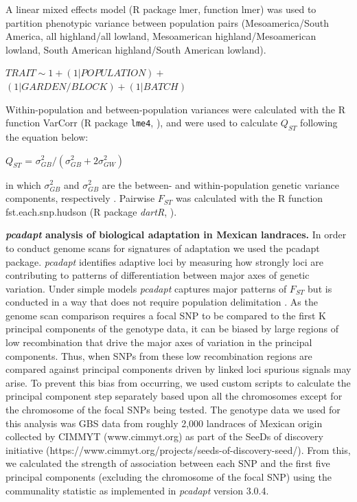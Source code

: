 \documentclass[9pt,twocolumn,twoside,lineno]{BioRxiv}
\begin{document}
A linear mixed effects model (R package lmer, function lmer) was used to partition phenotypic variance between population pairs (Mesoamerica/South America, all highland/all lowland, Mesoamerican highland/Mesoamerican lowland, South American highland/South American lowland).
\begin{center}
${ TRAIT \sim 1 + (1|POPULATION) + }$\\
${(1|GARDEN/BLOCK) + (1|BATCH)}$
\end{center}
Within-population and between-population variances were calculated with the R function VarCorr (R package \texttt{lme4}, \citealp{bates2014lme4}), and were used to calculate $Q_{ST}$ following the equation below:
\begin{center}
$Q_{ST}$ = \(\sigma^{2}_{GB}/(\sigma^{2}_{GB}+2\sigma^{2}_{GW})\)
\end{center}
\noindent in which $\sigma^{2}_{GB}$ and $\sigma^{2}_{GB}$ are the between- and within-population genetic variance components, respectively \cite{Leinonen2013-ic}.
Pairwise $F_{ST}$ was calculated with the R function fst.each.snp.hudson (R package \textit{dartR}, \citealp{gruber2018dartr}).

\textbf{\textit{pcadapt} analysis of biological adaptation in Mexican landraces.}
In order to conduct genome scans for signatures of adaptation we used the pcadapt \cite{Luu2017-ws} package.
\textit{pcadapt} identifies adaptive loci by measuring how strongly loci are contributing to patterns of differentiation between major axes of genetic variation.
Under simple models \textit{pcadapt} captures major patterns of $F_{ST}$  but is conducted in a way that does not require population delimitation \cite{duforet2014genome}.
As the genome scan comparison requires a focal SNP to be compared to the first K principal components of the genotype data, it can be biased by large regions of low recombination that drive the major axes of variation in the principal components.
Thus, when SNPs from these low recombination regions are compared against principal components driven by linked loci spurious signals may arise.
To prevent this bias from occurring, we used custom scripts to calculate the principal component step separately based upon all the chromosomes except for the chromosome of the focal SNPs being tested.
The genotype data we used for this analysis was GBS data from roughly 2,000 landraces of Mexican origin collected by CIMMYT (www.cimmyt.org) as part of the SeeDs of discovery initiative (https://www.cimmyt.org/projects/seeds-of-discovery-seed/).
From this, we calculated the strength of association between each SNP and the first five principal components (excluding the chromosome of the focal SNP) using the communality statistic as implemented in \textit{pcadapt} version 3.0.4.
\end{document}
